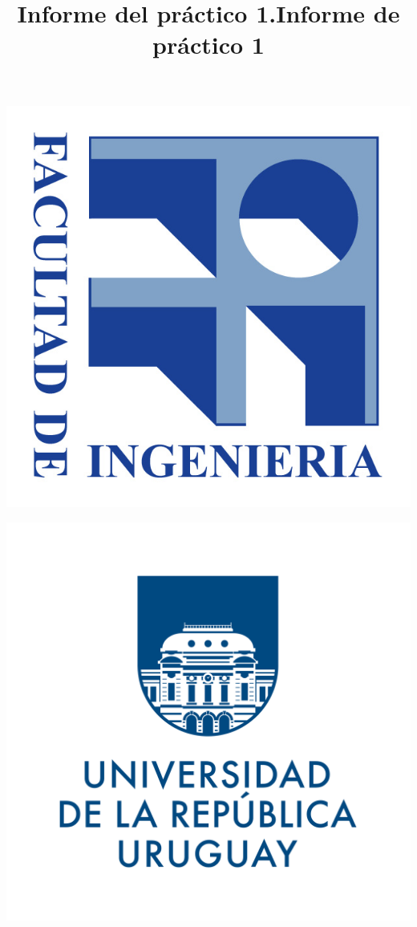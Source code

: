 \documentclass[11pt]{article}
\title{Informe del práctico 1.}
\title{Informe de práctico 1}
\begin{document}
\begin{center}																		%
\newcommand{\HRule}{\rule{\linewidth}{0.5mm}}									%
 

\begin{minipage}{0.48\textwidth} \begin{flushleft}
\includegraphics[scale = 0.5]{logo_FING.jpg}
\end{flushleft}\end{minipage}
\begin{minipage}{0.48\textwidth} \begin{flushright}
\includegraphics[scale = 0.05]{logo_UdelaR.png}

\end{flushright}
\end{minipage}
\end{center}
\end{document}
